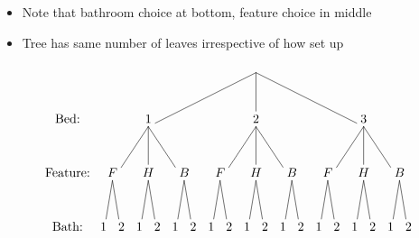 \documentclass[handout]{beamer}
\theoremstyle{definition}
\begin{document}
\begin{frame}
\begin{itemize}
\item Note that bathroom choice at bottom, feature choice in middle
\item Tree has same number of leaves irrespective of how set up
\end{itemize}
\[\begin{xy}<.5cm,0cm>:
(8.5,0)="0";
(2.5,-3)="1";
(8.5,-3)="2";
(14.5,-3)="3";
"0";"1"*+!D{1}**\dir{-};
"0";"2"*+!D{2}**\dir{-};
"0";"3"*+!D{3}**\dir{-};
(.5,-6)="11";
(2.5,-6)="12";
(4.5,-6)="13";
(6.5,-6)="21";
(8.5,-6)="22";
(10.5,-6)="23";
(12.5,-6)="31";
(14.5,-6)="32";
(16.5,-6)="33";
"1";"11"*+!D{F}**\dir{-};
"1";"12"*+!D{H}**\dir{-};
"1";"13"*+!D{B}**\dir{-};
"2";"21"*+!D{F}**\dir{-};
"2";"22"*+!D{H}**\dir{-};
"2";"23"*+!D{B}**\dir{-};
"3";"31"*+!D{F}**\dir{-};
"3";"32"*+!D{H}**\dir{-};
"3";"33"*+!D{B}**\dir{-};
"11";(0,-9)*+!D{1}**\dir{-};
"11";(1,-9)*+!D{2}**\dir{-};
"12";(2,-9)*+!D{1}**\dir{-};
"12";(3,-9)*+!D{2}**\dir{-};
"13";(4,-9)*+!D{1}**\dir{-};
"13";(5,-9)*+!D{2}**\dir{-};
"21";(6,-9)*+!D{1}**\dir{-};
"21";(7,-9)*+!D{2}**\dir{-};
"22";(8,-9)*+!D{1}**\dir{-};
"22";(9,-9)*+!D{2}**\dir{-};
"23";(10,-9)*+!D{1}**\dir{-};
"23";(11,-9)*+!D{2}**\dir{-};
"31";(12,-9)*+!D{1}**\dir{-};
"31";(13,-9)*+!D{2}**\dir{-};
"32";(14,-9)*+!D{1}**\dir{-};
"32";(15,-9)*+!D{2}**\dir{-};
"33";(16,-9)*+!D{1}**\dir{-};
"33";(17,-9)*+!D{2}**\dir{-};
(-2,-3)*+!D{\text{Bed:}};
(-2,-6)*+!D{\text{Feature:}};
(-2,-9)*+!D{\text{Bath:}};
\end{xy}\]
\end{frame}
\end{document}
